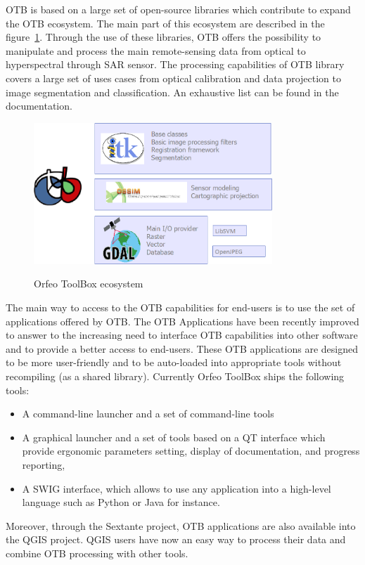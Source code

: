 \documentclass{josis}
\begin{document}
OTB is based on a large set of open-source libraries which contribute to expand the OTB ecosystem. The main part of this ecosystem are described in the figure~\ref{fig:ecosystem}. Through the use of these libraries, OTB offers the possibility to manipulate and process the main remote-sensing data from optical to hyperspectral through SAR sensor. The processing capabilities of OTB library covers a large set of uses cases from optical calibration and data projection to image segmentation and classification. An exhaustive list can be found in the documentation.

\begin{figure}[!htb]
\centering
\includegraphics[width=0.8\textwidth]{Pictures/otb_ecosystem}\label{fig:ecosystem}
\caption{Orfeo ToolBox ecosystem}
\end{figure}

The main way to access to the OTB capabilities for end-users is to use the set of applications offered by OTB. The OTB Applications have been recently improved to answer to the increasing need to interface OTB capabilities into other software and to provide a better access to end-users. These OTB applications are designed to be more user-friendly and to be auto-loaded into appropriate tools without recompiling (as a shared library). Currently Orfeo ToolBox ships the following tools:
\begin{itemize}
\item A command-line launcher and a set of command-line tools
\item A graphical launcher and a set of tools based on a QT interface which provide ergonomic parameters setting, display of documentation, and progress reporting,
\item A SWIG interface, which allows to use any application into a high-level language such as Python or Java for instance.
\end{itemize}
Moreover, through the Sextante project, OTB applications are also available into the QGIS project. QGIS users have now an easy way to process their data and combine OTB processing with other tools.
\end{document}
